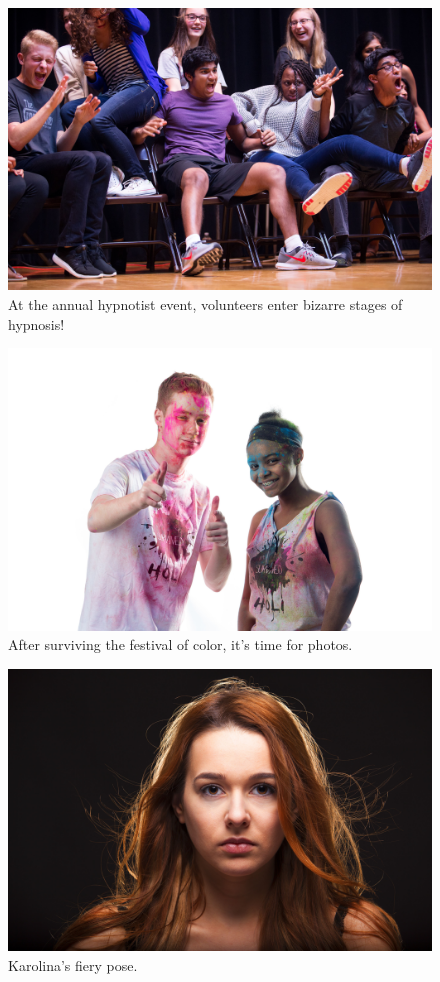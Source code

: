 \documentclass{report}
\begin{document}
\begin{figure}
  \includegraphics[width=\linewidth]{res/event_hypnotist.jpg}
  \caption{At the annual hypnotist event, volunteers enter bizarre stages of hypnosis!}
\end{figure}

\begin{figure}
  \includegraphics[width=\linewidth]{res/event_holi.jpg}
  \caption{After surviving the festival of color, it's time for photos.}
\end{figure}

\begin{figure}
  \includegraphics[width=\linewidth]{res/port_karolina.jpg}
  \caption{Karolina's fiery pose.}
\end{figure}
\end{document}
